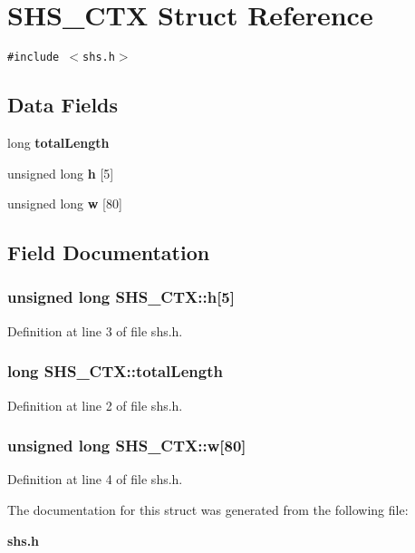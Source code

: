 \section{SHS\_\-CTX Struct Reference}
\label{structSHS__CTX}
{\tt \#include $<$shs.h$>$}

\subsection*{Data Fields}
\begin{CompactItemize}
\item 
long {\bf total\-Length}
\item 
unsigned long {\bf h} [5]
\item 
unsigned long {\bf w} [80]
\end{CompactItemize}


\subsection{Field Documentation}
\subsubsection{\setlength{\rightskip}{0pt plus 5cm}unsigned long {\bf SHS\_\-CTX::h}[5]}\label{structSHS__CTX_o1}




Definition at line 3 of file shs.h.
\subsubsection{\setlength{\rightskip}{0pt plus 5cm}long {\bf SHS\_\-CTX::total\-Length}}\label{structSHS__CTX_o0}




Definition at line 2 of file shs.h.
\subsubsection{\setlength{\rightskip}{0pt plus 5cm}unsigned long {\bf SHS\_\-CTX::w}[80]}\label{structSHS__CTX_o2}




Definition at line 4 of file shs.h.

The documentation for this struct was generated from the following file:\begin{CompactItemize}
\item 
{\bf shs.h}\end{CompactItemize}
